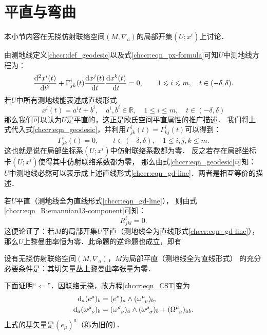 \section{平直与弯曲}\label{chccr:sec_flat-curved}


本小节内容在无挠仿射联络空间$(M,\nabla_a)$的局部开集$(U;x^i)$上讨论．

由测地线定义\ref{chccr:def_geodesic}以及式\eqref{chccr:eqn_px-formula}可知$U$中测地线方程为：
\begin{equation}\label{chccr:eqn_geodesic}
	\frac{{\rm d}^2 x^i(t)}{{\rm d}t^2} + \Gamma_{jk}^i(t)
	\frac{{\rm d}x^j(t)}{{\rm d} t} \frac{{\rm d}x^k(t)}{{\rm d} t} =0,
	\qquad 1 \leqslant i \leqslant m , \quad t\in (-\delta,\delta).
\end{equation}
若$U$中所有测地线能表述成直线形式
\begin{equation}\label{chccr:eqn_gd-line}
	x^i(t) = a^i t + b^i, \quad a^i,b^i\in \mathbb{R}, \quad 1 \leqslant i \leqslant m , \quad t\in (-\delta,\delta)
\end{equation}
那么我们可以认为$U$是平直的，这正是欧氏空间平直属性的推广描述．
我们将上式代入式\eqref{chccr:eqn_geodesic}，并利用$\Gamma_{jk}^i(t)=\Gamma_{kj}^i(t)$可以得到：
\begin{equation}
	\Gamma_{jk}^i(t) =0 , \qquad t\in (-\delta,\delta), \quad 1\leqslant i,j,k \leqslant m.
\end{equation}
这也就是说在局部坐标系$(U;x^i)$中仿射联络系数都为零．
反之若存在局部坐标卡$(U;x^i)$使得其中仿射联络系数都为零，
那么由式\eqref{chccr:eqn_geodesic}可知：
$U$中测地线必然可以表示成上述直线形式\eqref{chccr:eqn_gd-line}．两者是相互等价的描述．

若$U$平直（测地线全为直线形式\eqref{chccr:eqn_gd-line}），
则由式\eqref{chccr:eqn_Riemannian13-component}可知：
\begin{equation}
	R^i_{jkl} = 0.
\end{equation}
这便论证了：若$M$的局部开集$U$平直（测地线全为直线形式\eqref{chccr:eqn_gd-line}），
那么$U$上黎曼曲率恒为零．此命题的逆命题也成立，即有

\begin{theorem}\label{chccr:thm_local-EuclideanSpace}
	设有无挠仿射联络空间$(M,\nabla_a)$，$M$为局部平直（测地线全为直线形式）
	的充分必要条件是：其切矢量丛上黎曼曲率张量为零．
\end{theorem}

下面证明“$\Leftarrow$”．因联络无挠，故方程\eqref{chccr:eqn_CST}变为
\begin{subequations}\label{chccr:eqn_CST-Rieman-Conn}
	\begin{align}
		{\rm d}_a (e^\mu)_b &=(e^\nu)_a \wedge (\omega _{\hphantom{\mu} \nu}^\mu)_b , \label{chccr:eqn_CST-Rieman-Conn-I} \\
		{\rm d}_a ( \omega _{\hphantom{\mu} \nu} ^\mu  )_b  &=  ( \omega _{\hphantom{\mu} \nu}^\sigma )_a
		\wedge ( \omega _{\hphantom{\mu} \sigma}^\mu )_b + (\Omega_{\hphantom{\mu} \nu} ^{\mu})_{ab}. \label{chccr:eqn_CST-Rieman-Conn-II}
	\end{align}
\end{subequations}
上式的基矢量是$(e_\mu)^a$（称为旧的）．

